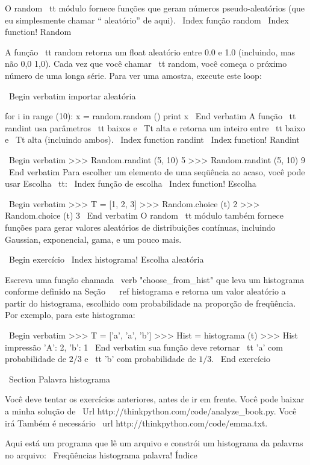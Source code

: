 \documentclass[10pt]{book}
\begin{document}
{{{{{{{{{O {random \ tt} módulo fornece funções que geram
números pseudo-aleatórios (que eu simplesmente chamar `` aleatório'' de
aqui).
\ Index {função random}
\ Index {function! Random}

A função {\ tt random} retorna um float aleatório
entre 0.0 e 1.0 (incluindo, mas não 0,0 1,0). Cada vez que você
chamar {\ tt random}, você começa o próximo número de uma longa série. Para ver uma
amostra, execute este loop:

\ Begin {verbatim}
importar aleatória

for i in range (10):
    x = random.random ()
    print x
\ End {verbatim}
%
A função {\ tt randint} usa parâmetros {\ tt baixos} e
{\ Tt alta} e retorna um inteiro entre {\ tt baixo} e
{\ Tt alta} (incluindo ambos).
\ Index {function randint}
\ Index {function! Randint}

\ Begin {verbatim}
>>> Random.randint (5, 10)
5
>>> Random.randint (5, 10)
9
\ End {verbatim}
%
Para escolher um elemento de uma seqüência ao acaso, você pode usar
{Escolha \ tt}:
\ Index {função de escolha}
\ Index {function! Escolha}

\ Begin {verbatim}
>>> T = [1, 2, 3]
>>> Random.choice (t)
2
>>> Random.choice (t)
3
\ End {verbatim}
%
O {random \ tt} módulo também fornece funções para gerar
valores aleatórios de distribuições contínuas, incluindo
Gaussian, exponencial, gama, e um pouco mais.

\ Begin {} exercício
\ Index {histograma! Escolha aleatória}

Escreva uma função chamada \ verb "choose_from_hist" que leva
um histograma conforme definido na Seção ~ \ ref {} histograma e retorna um 
valor aleatório a partir do histograma, escolhido com probabilidade
na proporção de freqüência. Por exemplo, para este histograma:

\ Begin {verbatim}
>>> T = ['a', 'a', 'b']
>>> Hist = histograma (t)
>>> Hist impressão
{'A': 2, 'b': 1}
\ End {verbatim}
%
sua função deve retornar {\ tt 'a'} com probabilidade de $ 2/3 $ e {\ tt 'b'}
com probabilidade de $ 1/3 $.
\ End {} exercício


\ Section {Palavra histograma}

Você deve tentar os exercícios anteriores, antes de ir em frente.
Você pode baixar a minha solução de
 \ Url {http://thinkpython.com/code/analyze_book.py}. Você irá
Também é necessário \ url {http://thinkpython.com/code/emma.txt}.

Aqui está um programa que lê um arquivo e constrói um histograma da
palavras no arquivo:
\ {Freqüências histograma palavra!} Índice

}}}}}}}}}
\end{document}

